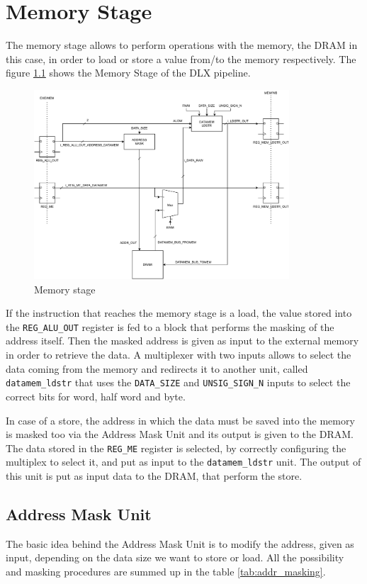 \chapter{Memory Stage}
The memory stage allows to perform operations with the memory, the DRAM in this case, in order to load or store a value from/to the memory respectively. The figure \ref{fig:mem_stage} shows the Memory Stage of the DLX pipeline.

\begin{figure}[H]   
	\centering
	\includegraphics[width=0.85\textwidth]{chapters/6_MemoryStage/images/mem_stage.pdf}
	\caption{Memory stage}
	\label{fig:mem_stage}
\end{figure}

If the instruction that reaches the memory stage is a load, the value stored into the \texttt{REG\_ALU\_OUT} register is fed to a block that performs the masking of the address itself. Then the masked address is given as input to the external memory in order to retrieve the data. A multiplexer with two inputs allows to select the data coming from the memory and redirects it to another unit, called \texttt{datamem\_ldstr} that uses the \texttt{DATA\_SIZE} and \texttt{UNSIG\_SIGN\_N} inputs to select the correct bits for word, half word and byte.

In case of a store, the address in which the data must be saved into the memory is masked too via the Address Mask Unit and its output is given to the DRAM. The data stored in the \texttt{REG\_ME} register is selected, by correctly configuring the multiplex to select it, and put as input to the \texttt{datamem\_ldstr} unit. The output of this unit is put as input data to the DRAM, that perform the store.

\section{Address Mask Unit}
The basic idea behind the Address Mask Unit is to modify the address, given as input, depending on the data size we want to store or load. All the possibility and masking procedures are summed up in the table \ref{tab:addr_masking}. 

